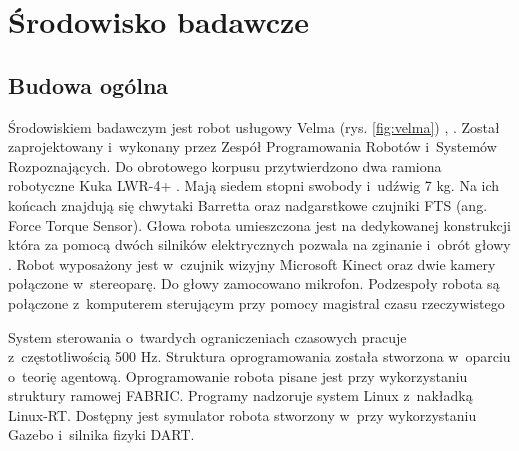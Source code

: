 
\chapter{Środowisko badawcze\label{chap:srodowisko}}
	\section{Budowa ogólna}
	Środowiskiem badawczym jest robot usługowy Velma (rys. \ref{fig:velma}) \cite{bib:velma2}, \cite{velma}. Został zaprojektowany i~wykonany przez Zespół Programowania Robotów i~Systemów Rozpoznających\cite{bib:robotyka}. Do obrotowego korpusu przytwierdzono dwa ramiona robotyczne Kuka LWR-4+\cite{bib:kukaPage} \cite{bib:kuka}. Mają siedem stopni swobody i~udźwig 7 kg. Na ich końcach znajdują się chwytaki Barretta\cite{bib:barrett}  oraz nadgarstkowe czujniki FTS (ang. Force Torque Sensor). Głowa robota umieszczona jest na dedykowanej konstrukcji która za pomocą dwóch silników elektrycznych pozwala na zginanie i~obrót głowy\cite{bib:velmaLeb} \cite{bib:velmaKorp}. Robot wyposażony jest w~czujnik wizyjny Microsoft Kinect oraz dwie kamery połączone w~stereoparę. Do głowy zamocowano mikrofon. Podzespoły robota są połączone z~komputerem sterującym przy pomocy magistral czasu rzeczywistego
	
	System sterowania o~twardych ograniczeniach czasowych pracuje z~częstotliwością 500 Hz. Struktura oprogramowania została stworzona w~oparciu o~teorię agentową. Oprogramowanie robota pisane jest przy wykorzystaniu struktury ramowej FABRIC. Programy nadzoruje system Linux z~nakładką Linux-RT. Dostępny jest symulator robota stworzony w~przy wykorzystaniu Gazebo i~silnika fizyki DART. 
	
